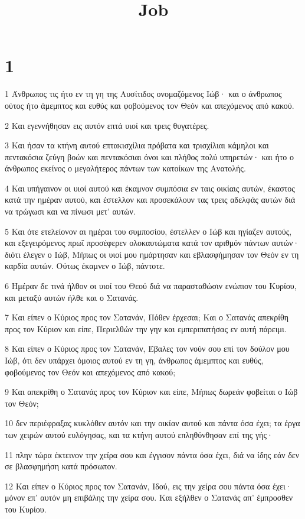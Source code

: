 

\title{Job}


\chapter{1}

\par 1 Άνθρωπος τις ήτο εν τη γη της Αυσίτιδος ονομαζόμενος Ιώβ· και ο άνθρωπος ούτος ήτο άμεμπτος και ευθύς και φοβούμενος τον Θεόν και απεχόμενος από κακού.
\par 2 Και εγεννήθησαν εις αυτόν επτά υιοί και τρεις θυγατέρες.
\par 3 Και ήσαν τα κτήνη αυτού επτακισχίλια πρόβατα και τρισχίλιαι κάμηλοι και πεντακόσια ζεύγη βοών και πεντακόσιαι όνοι και πλήθος πολύ υπηρετών· και ήτο ο άνθρωπος εκείνος ο μεγαλήτερος πάντων των κατοίκων της Ανατολής.
\par 4 Και υπήγαινον οι υιοί αυτού και έκαμνον συμπόσια εν ταις οικίαις αυτών, έκαστος κατά την ημέραν αυτού, και έστελλον και προσεκάλουν τας τρεις αδελφάς αυτών διά να τρώγωσι και να πίνωσι μετ' αυτών.
\par 5 Και ότε ετελείονον αι ημέραι του συμποσίου, έστελλεν ο Ιώβ και ηγίαζεν αυτούς, και εξεγειρόμενος πρωΐ προσέφερεν ολοκαυτώματα κατά τον αριθμόν πάντων αυτών· διότι έλεγεν ο Ιώβ, Μήπως οι υιοί μου ημάρτησαν και εβλασφήμησαν τον Θεόν εν τη καρδία αυτών. Ούτως έκαμνεν ο Ιώβ, πάντοτε.
\par 6 Ημέραν δε τινά ήλθον οι υιοί του Θεού διά να παρασταθώσιν ενώπιον του Κυρίου, και μεταξύ αυτών ήλθε και ο Σατανάς.
\par 7 Και είπεν ο Κύριος προς τον Σατανάν, Πόθεν έρχεσαι; Και ο Σατανάς απεκρίθη προς τον Κύριον και είπε, Περιελθών την γην και εμπεριπατήσας εν αυτή πάρειμι.
\par 8 Και είπεν ο Κύριος προς τον Σατανάν, Έβαλες τον νούν σου επί τον δούλον μου Ιώβ, ότι δεν υπάρχει όμοιος αυτού εν τη γη, άνθρωπος άμεμπτος και ευθύς, φοβούμενος τον Θεόν και απεχόμενος από κακού;
\par 9 Και απεκρίθη ο Σατανάς προς τον Κύριον και είπε, Μήπως δωρεάν φοβείται ο Ιώβ τον Θεόν;
\par 10 δεν περιέφραξας κυκλόθεν αυτόν και την οικίαν αυτού και πάντα όσα έχει; τα έργα των χειρών αυτού ευλόγησας, και τα κτήνη αυτού επληθύνθησαν επί της γής·
\par 11 πλην τώρα έκτεινον την χείρα σου και έγγισον πάντα όσα έχει, διά να ίδης εάν δεν σε βλασφημήση κατά πρόσωπον.
\par 12 Και είπεν ο Κύριος προς τον Σατανάν, Ιδού, εις την χείρα σου πάντα όσα έχει· μόνον επ' αυτόν μη επιβάλης την χείρα σου. Και εξήλθεν ο Σατανάς απ' έμπροσθεν του Κυρίου.
